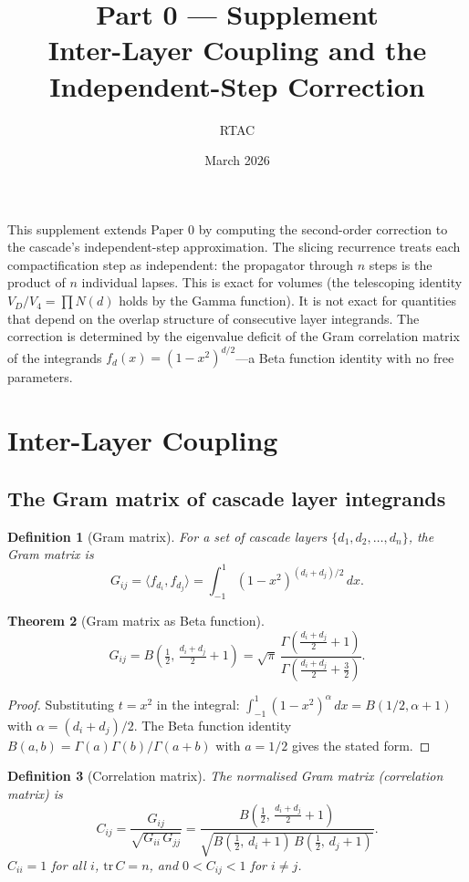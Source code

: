 \documentclass[12pt,a4paper]{article}
\title{Part 0 --- Supplement\\[6pt]
\large Inter-Layer Coupling and the Independent-Step Correction}
\author{RTAC}
\date{March 2026}
\newtheorem{theorem}{Theorem}[section]
\newtheorem{definition}[theorem]{Definition}
\theoremstyle{remark}
\begin{document}
\maketitle

\noindent This supplement extends Paper 0 by computing the second-order correction to the cascade's independent-step approximation. The slicing recurrence treats each compactification step as independent: the propagator through $n$ steps is the product of $n$ individual lapses. This is exact for volumes (the telescoping identity $V_D/V_4 = \prod N(d)$ holds by the Gamma function). It is not exact for quantities that depend on the overlap structure of consecutive layer integrands. The correction is determined by the eigenvalue deficit of the Gram correlation matrix of the integrands $f_d(x) = (1 - x^2)^{d/2}$---a Beta function identity with no free parameters.

\setcounter{section}{14}
\section{Inter-Layer Coupling}

\subsection{The Gram matrix of cascade layer integrands}

\begin{definition}[Gram matrix]
For a set of cascade layers $\{d_1, d_2, \ldots, d_n\}$, the Gram matrix is
\[
G_{ij} = \langle f_{d_i}, f_{d_j} \rangle = \int_{-1}^{1} (1 - x^2)^{(d_i + d_j)/2}\, dx.
\]
\end{definition}

\begin{theorem}[Gram matrix as Beta function]\label{thm:gram}
\[
G_{ij} = B\!\left(\tfrac{1}{2},\, \tfrac{d_i + d_j}{2} + 1\right) = \sqrt{\pi}\, \frac{\Gamma\!\left(\frac{d_i + d_j}{2} + 1\right)}{\Gamma\!\left(\frac{d_i + d_j}{2} + \frac{3}{2}\right)}.
\]
\end{theorem}

\begin{proof}
Substituting $t = x^2$ in the integral: $\int_{-1}^{1}(1 - x^2)^\alpha\, dx = B(1/2, \alpha + 1)$ with $\alpha = (d_i + d_j)/2$. The Beta function identity $B(a,b) = \Gamma(a)\Gamma(b)/\Gamma(a+b)$ with $a = 1/2$ gives the stated form.
\end{proof}

\begin{definition}[Correlation matrix]
The normalised Gram matrix (correlation matrix) is
\[
C_{ij} = \frac{G_{ij}}{\sqrt{G_{ii}\, G_{jj}}} = \frac{B\!\left(\frac{1}{2},\, \frac{d_i + d_j}{2} + 1\right)}{\sqrt{B\!\left(\frac{1}{2},\, d_i + 1\right)\, B\!\left(\frac{1}{2},\, d_j + 1\right)}}.
\]
$C_{ii} = 1$ for all $i$, $\mathrm{tr}\, C = n$, and $0 < C_{ij} < 1$ for $i \neq j$.
\end{definition}
\end{document}

